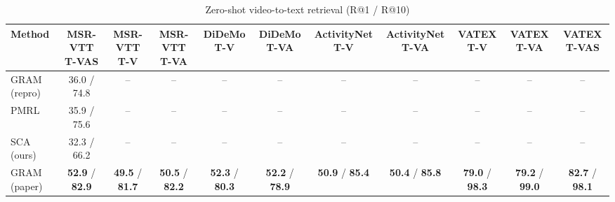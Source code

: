 \begin{table}[t]
\centering
\caption{Zero-shot video-to-text retrieval (R@1 / R@10)}
\label{tab:zeroshot_v2t}
\small
\begin{tabular}{lcccccccccc}
\toprule
Method & MSR-VTT T-VAS & MSR-VTT T-V & MSR-VTT T-VA & DiDeMo T-V & DiDeMo T-VA & ActivityNet T-V & ActivityNet T-VA & VATEX T-V & VATEX T-VA & VATEX T-VAS \\
\midrule
GRAM (repro) & 36.0 / 74.8 & -- & -- & -- & -- & -- & -- & -- & -- & -- \\
PMRL & 35.9 / 75.6 & -- & -- & -- & -- & -- & -- & -- & -- & -- \\
SCA (ours) & 32.3 / 66.2 & -- & -- & -- & -- & -- & -- & -- & -- & -- \\
GRAM (paper) & \textbf{52.9} / \textbf{82.9} & \textbf{49.5} / \textbf{81.7} & \textbf{50.5} / \textbf{82.2} & \textbf{52.3} / \textbf{80.3} & \textbf{52.2} / \textbf{78.9} & \textbf{50.9} / \textbf{85.4} & \textbf{50.4} / \textbf{85.8} & \textbf{79.0} / \textbf{98.3} & \textbf{79.2} / \textbf{99.0} & \textbf{82.7} / \textbf{98.1} \\
\bottomrule
\end{tabular}
\end{table}
